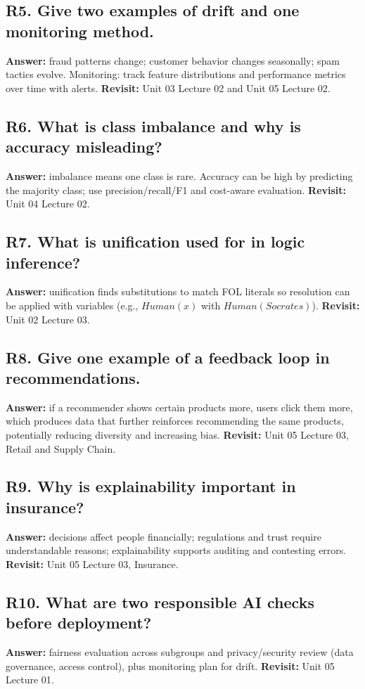 \documentclass[11pt]{article}
\begin{document}
\subsection*{R5. Give two examples of drift and one monitoring method.}
\textbf{Answer:} fraud patterns change; customer behavior changes seasonally; spam tactics evolve. Monitoring: track feature distributions and performance metrics over time with alerts.
\textbf{Revisit:} Unit 03 Lecture 02 and Unit 05 Lecture 02.

\subsection*{R6. What is class imbalance and why is accuracy misleading?}
\textbf{Answer:} imbalance means one class is rare. Accuracy can be high by predicting the majority class; use precision/recall/F1 and cost-aware evaluation.
\textbf{Revisit:} Unit 04 Lecture 02.

\subsection*{R7. What is unification used for in logic inference?}
\textbf{Answer:} unification finds substitutions to match FOL literals so resolution can be applied with variables (e.g., $Human(x)$ with $Human(Socrates)$).
\textbf{Revisit:} Unit 02 Lecture 03.

\subsection*{R8. Give one example of a feedback loop in recommendations.}
\textbf{Answer:} if a recommender shows certain products more, users click them more, which produces data that further reinforces recommending the same products, potentially reducing diversity and increasing bias.
\textbf{Revisit:} Unit 05 Lecture 03, Retail and Supply Chain.

\subsection*{R9. Why is explainability important in insurance?}
\textbf{Answer:} decisions affect people financially; regulations and trust require understandable reasons; explainability supports auditing and contesting errors.
\textbf{Revisit:} Unit 05 Lecture 03, Insurance.

\subsection*{R10. What are two responsible AI checks before deployment?}
\textbf{Answer:} fairness evaluation across subgroups and privacy/security review (data governance, access control), plus monitoring plan for drift.
\textbf{Revisit:} Unit 05 Lecture 01.
\end{document}
